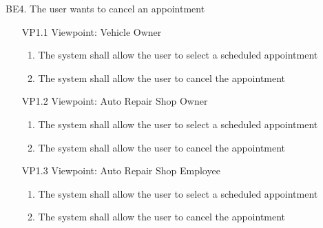 \documentclass[12pt]{article}
\begin{document}
\item [{BE}4.] The user wants to cancel an appointment
\begin{enumerate}
	\item [{VP1}.1] Viewpoint: Vehicle Owner
	      \begin{enumerate}
		      \item The system shall allow the user to select a scheduled appointment
		      \item The system shall allow the user to cancel the appointment
	      \end{enumerate}
\end{enumerate}
\begin{enumerate}
	\item [{VP1}.2] Viewpoint: Auto Repair Shop Owner
	      \begin{enumerate}
		      \item The system shall allow the user to select a scheduled appointment
		      \item The system shall allow the user to cancel the appointment
	      \end{enumerate}
\end{enumerate}
\begin{enumerate}
	\item [{VP1}.3] Viewpoint: Auto Repair Shop Employee
	      \begin{enumerate}
		      \item The system shall allow the user to select a scheduled appointment
		      \item The system shall allow the user to cancel the appointment
	      \end{enumerate}
\end{enumerate}
\end{document}
